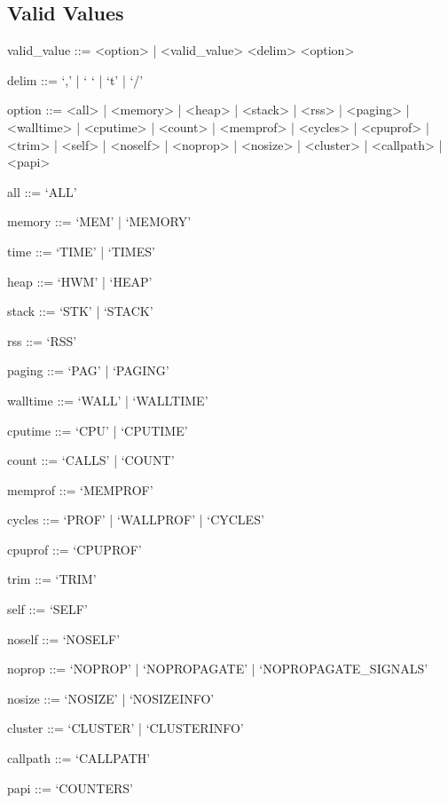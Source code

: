 \documentclass[letterpaper,10pt,english]{sphinxmanual}
\begin{document}
\subsection{Valid Values}
\label{\detokenize{flag/flag:id243}}
\begin{DUlineblock}{0em}
\item[] valid\_value ::= \textless{}option\textgreater{} |  \textless{}valid\_value\textgreater{} \textless{}delim\textgreater{} \textless{}option\textgreater{}
\item[] delim ::= ‘,’ | ‘ ‘ | ‘t’ | ‘/’
\item[] option ::= \textless{}all\textgreater{} | \textless{}memory\textgreater{} | \textless{}heap\textgreater{} | \textless{}stack\textgreater{} | \textless{}rss\textgreater{} | \textless{}paging\textgreater{} | \textless{}walltime\textgreater{} | \textless{}cputime\textgreater{} | \textless{}count\textgreater{} | \textless{}memprof\textgreater{} | \textless{}cycles\textgreater{} | \textless{}cpuprof\textgreater{} | \textless{}trim\textgreater{} | \textless{}self\textgreater{} | \textless{}noself\textgreater{} | \textless{}noprop\textgreater{} | \textless{}nosize\textgreater{} | \textless{}cluster\textgreater{} | \textless{}callpath\textgreater{} | \textless{}papi\textgreater{}
\item[] all ::= ‘ALL’
\item[] memory ::= ‘MEM’ | ‘MEMORY’
\item[] time ::= ‘TIME’ | ‘TIMES’
\item[] heap ::= ‘HWM’ | ‘HEAP’
\item[] stack ::= ‘STK’ | ‘STACK’
\item[] rss ::= ‘RSS’
\item[] paging ::= ‘PAG’ | ‘PAGING’
\item[] walltime ::= ‘WALL’ | ‘WALLTIME’
\item[] cputime ::= ‘CPU’ | ‘CPUTIME’
\item[] count ::= ‘CALLS’ | ‘COUNT’
\item[] memprof ::= ‘MEMPROF’
\item[] cycles ::= ‘PROF’ | ‘WALLPROF’ | ‘CYCLES’
\item[] cpuprof ::= ‘CPUPROF’
\item[] trim ::= ‘TRIM’
\item[] self ::= ‘SELF’
\item[] noself ::= ‘NOSELF’
\item[] noprop ::= ‘NOPROP’ | ‘NOPROPAGATE’ | ‘NOPROPAGATE\_SIGNALS’
\item[] nosize ::= ‘NOSIZE’ | ‘NOSIZEINFO’
\item[] cluster ::= ‘CLUSTER’ | ‘CLUSTERINFO’
\item[] callpath ::= ‘CALLPATH’
\item[] papi ::= ‘COUNTERS’
\end{DUlineblock}
\end{document}
